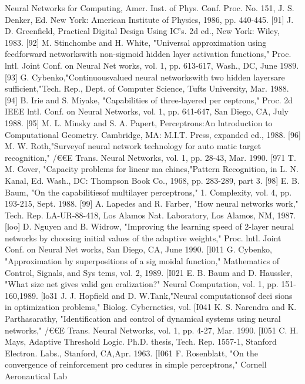 \documentclass[11pt,a4paper,twocolumn]{article}
\begin{document}
{{\newpage


Neural Networks for Computing, Amer. Inst. of Phys. Conf. 
Proc. No. 151, J. S. Denker, Ed. New York: American Institute 
of Physics, 1986, pp. 440-445. 
[91] J. D. Greenfield, Practical Digital Design Using IC's. 2d ed., 
New York: Wiley, 1983. 
[92] M. Stinchombe and H. White, "Universal approximation 
using feedforward networkswith non-sigmoid hidden layer 
activation functions," Proc. lntl. Joint Conf. on Neural Net
works, vol. 1, pp. 613-617, Wash., DC, June 1989. 
[93] G. Cybenko,"Continuousvalued neural networkswith two 
hidden layersare sufficient,"Tech. Rep., Dept. of Computer 
Science, Tufts University, Mar. 1988. 
[94] B. Irie and S. Miyake, "Capabilities of three-layered per
ceptrons," Proc. 2d IEEE lntl. Conf. on Neural Networks, vol. 
1, pp. 641-647, San Diego, CA, July 1988. 
[95] M. L. Minsky and S. A. Papert, Perceptrons:An lntroduction 
to Computational Geometry. Cambridge, MA: M.I.T. Press, 
expanded ed., 1988. 
[96] M. W. Roth,"Surveyof neural network technology for auto
matic target recognition," /€€E Trans. Neural Networks, vol. 
1, pp. 28-43, Mar. 1990. 
[971 T. 
M. Cover, "Capacity 
problems for linear ma
chines,"Pattern Recognition, in L. N. Kanal, Ed. Wash., DC: 
Thompson Book Co., 1968, pp. 283-289, part 3. 
[98] E. B. Baum, "On the capabilitiesof multilayer perceptrons," 
1. Complexity, vol. 4, pp. 193-215, Sept. 1988. 
[99] A. Lapedes and R. Farber, "How neural networks work," 
Tech. Rep. LA-UR-88-418, Los Alamos Nat. Laboratory, Los 
Alamos, NM, 1987. 
[loo] D. Nguyen and B. Widrow, "Improving the learning speed 
of 2-layer neural networks by choosing initial values of the 
adaptive weights," Proc. lntl. Joint Conf. on Neural Net
works, San Diego, CA, June 1990. 
[I011 G. Cybenko, "Approximation by superpositions of a sig
moidal function," Mathematics of Control, Signals, and Sys
tems, vol. 2, 1989. 
[I021 E. B. Baum and D. Haussler, "What size net gives valid gen
eralization?" Neural Computation, vol. 1, pp. 151-160,1989. 
[lo31 J. J. Hopfield and D. W.Tank,"Neural computationsof deci
sions in optimization problems," Biolog. Cybernetics, vol. 
[I041 K. S. Narendra and K. Parthasarathy, "Identification and 
control of dynamical systems using neural networks," /€€E 
Trans. Neural Networks, vol. 1, pp. 4-27, Mar. 1990. 
[I051 C. H. Mays, Adaptive Threshold Logic. Ph.D. thesis, Tech. 
Rep. 1557-1, Stanford Electron. Labs., Stanford, CA,Apr. 1963. 
[I061 F. Rosenblatt, "On the convergence of reinforcement pro
cedures in simple perceptrons," Cornell Aeronautical Lab
}}
\end{document}
